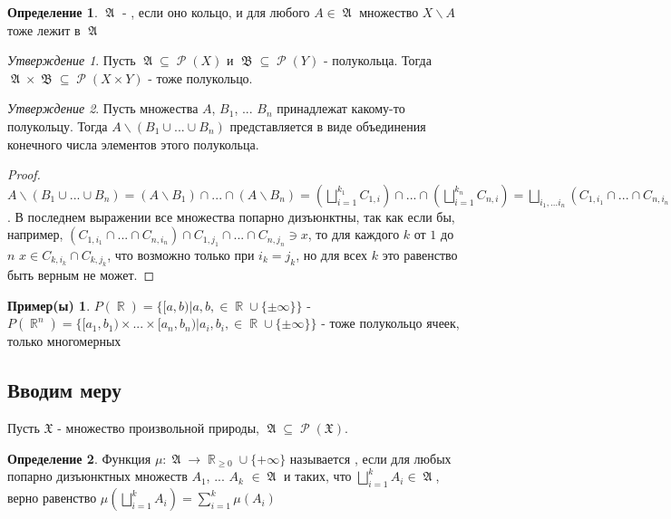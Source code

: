 \documentclass[a4paper]{article}
\theoremstyle{indented}
\theoremstyle{definition}
\newtheorem{defn}{Определение}
\newtheorem{exl}{Пример(ы)}
\theoremstyle{remark}
\newtheorem{stat}{Утверждение}
\DeclareMathOperator{\ra}{\rightarrow}
\DeclareMathOperator{\RR}{\mathbb{R}}
\DeclareMathOperator{\GA}{\mathfrak{A}}
\DeclareMathOperator{\GB}{\mathfrak{B}}
\DeclareMathOperator{\Rho}{\mathcal{P}}
\begin{document}
\begin{defn}
    $\GA$ - , если оно кольцо, и для любого $A \in \GA$ множество $X \backslash A$ тоже лежит в $\GA$
\end{defn}

\begin{stat}
    Пусть $\GA \subseteq \Rho(X)$ и $\GB \subseteq \Rho(Y)$ - полукольца. Тогда $\GA \times \GB \subseteq \Rho(X \times Y)$ - тоже полукольцо.
\end{stat}

\begin{stat}
    Пусть множества $A$, $B_1$, ... $B_n$ принадлежат какому-то полукольцу. Тогда $A \backslash (B_1 \cup ... \cup B_n)$ представляется в виде объединения конечного числа элементов этого полукольца.
\end{stat}

\begin{proof}
    $A \backslash (B_1 \cup ... \cup B_n)=(A \backslash B_1) \cap ... \cap (A \backslash B_n)=(\bigsqcup_{i=1}^{k_1}C_{1, i}) \cap ... \cap (\bigsqcup_{i=1}^{k_n}C_{n, i}) = \bigsqcup_{i_1, ... i_n} (C_{1, i_1} \cap ... \cap C_{n, i_n})$. В последнем выражении все множества попарно дизъюнктны, так как если бы, например, $(C_{1, i_1} \cap ... \cap C_{n, i_n}) \cap C_{1, j_1} \cap ... \cap C_{n, j_n} \ni x$, то для каждого $k$ от $1$ до $n$ $x \in C_{k, i_k} \cap C_{k, j_k}$, что возможно только при $i_k=j_k$, но для всех $k$ это равенство быть верным не может.
\end{proof}

\begin{exl}
    $P(\RR)=\{[a, b) | a, b, \in \RR \cup \{\pm \infty\}\}$ - 
    \\
    $P(\RR^n)=\{[a_1, b_1) \times ... \times [a_n, b_n) | a_i, b_i, \in \RR \cup \{\pm \infty\}\}$ - тоже полукольцо ячеек, только многомерных
\end{exl}

\subsection{Вводим меру}

Пусть $\mathfrak{X}$ - множество произвольной природы, $\GA \subseteq \Rho(\mathfrak{X})$. 

\begin{defn}
    Функция $\mu: \GA \ra \RR_{\geq 0} \cup \{+\infty\}$ называется , если для любых попарно дизъюнктных множеств $A_1$, ... $A_k$ $\in \GA$ и таких, что $\bigsqcup_{i=1}^k A_i \in \GA$, верно равенство $\mu(\bigsqcup_{i=1}^k A_i)=\sum_{i=1}^k \mu(A_i)$
\end{defn}
\end{document}
